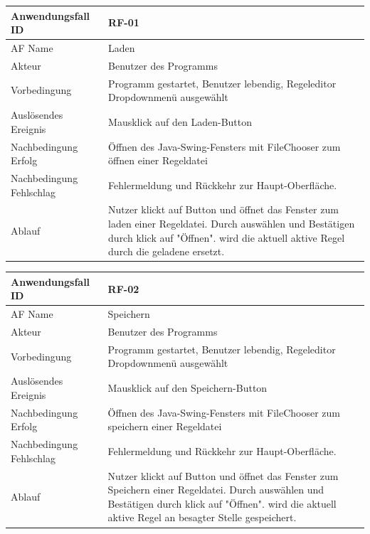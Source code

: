 \documentclass[11pt,a4paper]{article}
\begin{document}

	\begin{tabular}[m]{|m{7cm}|m{9cm}|}
		\hline
		Anwendungsfall ID     & RF-01 \\ %
		\hline
		AF Name     &  Laden \\
		\hline
		Akteur&Benutzer des Programms \\
		\hline
		Vorbedingung&Programm gestartet, Benutzer lebendig, Regeleditor Dropdownmenü ausgewählt\\
		\hline
		Auslösendes Ereignis&Mausklick auf den Laden-Button\\
		\hline
		Nachbedingung Erfolg&Öffnen des Java-Swing-Fensters mit FileChooser zum öffnen einer Regeldatei\\
		\hline
		Nachbedingung Fehlschlag&Fehlermeldung und Rückkehr zur Haupt-Oberfläche.\\
		\hline
		Ablauf&Nutzer klickt auf Button und öffnet das Fenster zum laden einer Regeldatei. Durch auswählen und Bestätigen durch klick auf "Öffnen". wird die aktuell aktive Regel durch die geladene ersetzt.\\
		\hline
	\end{tabular}
	\par
	
	\begin{tabular}[m]{|m{7cm}|m{9cm}|}
		\hline
		Anwendungsfall ID     & RF-02 \\ %
		\hline
		AF Name     &  Speichern \\
		\hline
		Akteur&Benutzer des Programms \\
		\hline
		Vorbedingung&Programm gestartet, Benutzer lebendig, Regeleditor Dropdownmenü ausgewählt\\
		\hline
		Auslösendes Ereignis&Mausklick auf den Speichern-Button\\
		\hline
		Nachbedingung Erfolg&Öffnen des Java-Swing-Fensters mit FileChooser zum speichern einer Regeldatei\\
		\hline
		Nachbedingung Fehlschlag&Fehlermeldung und Rückkehr zur Haupt-Oberfläche.\\
		\hline
		Ablauf&Nutzer klickt auf Button und öffnet das Fenster zum Speichern einer Regeldatei. Durch auswählen und Bestätigen durch klick auf "Öffnen". wird die aktuell aktive Regel an besagter Stelle gespeichert.\\
		\hline
	\end{tabular}
	\par
\end{document}

